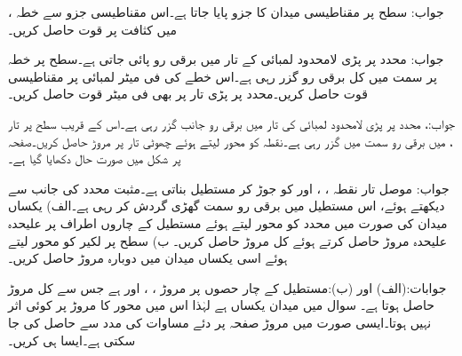 جواب:
سطح  پر مقناطیسی میدان کا  جزو  پایا جاتا ہے۔اس مقناطیسی جزو سے خطہ ،  میں کثافت  پر قوت حاصل کریں۔

جواب:
 محدد پر پڑی لامحدود لمبائی کے تار میں  برقی رو پائی جاتی ہے۔سطح  پر خطہ  پر  سمت میں کل  برقی رو گزر رہی ہے۔اس خطے کی فی میٹر لمبائی پر مقناطیسی قوت حاصل کریں۔محدد  پر پڑی تار پر بھی فی میٹر قوت حاصل کریں۔

جواب:، 
محدد  پر پڑی لامحدود لمبائی کی تار میں  برقی رو  جانب گزر رہی ہے۔اس کے قریب سطح  پر تار ،  میں  برقی رو  سمت میں گزر رہی ہے۔نقطہ  کو محور لیتے ہوئے چھوٹی تار پر مروڑ حاصل کریں۔صفحہ  پر شکل  میں صورت حال دکھایا گیا ہے۔

جواب:
موصل تار نقطہ ، ،  اور  کو جوڑ کر مستطیل بناتی ہے۔مثبت  محدد کی جانب سے دیکھتے ہوئے، اس مستطیل میں  برقی رو سمت گھڑی گردش کر رہی ہے۔الف)  یکساں میدان  کی صورت میں  محدد  کو محور لیتے ہوئے مستطیل کے چاروں اطراف پر علیحدہ علیحدہ  مروڑ حاصل کرتے ہوئے کل مروڑ حاصل کریں۔ ب) سطح  پر لکیر  کو محور لیتے ہوئے اسی یکساں میدان میں دوبارہ مروڑ حاصل کریں۔

جوابات:(الف) اور (ب):مستطیل کے چار حصوں پر مروڑ ، ،  اور  ہے جس سے  کل مروڑ  حاصل ہوتا ہے۔
سوال  میں میدان یکساں ہے لہٰذا اس میں محور کا مروڑ پر کوئی اثر نہیں ہوتا۔ایسی صورت میں مروڑ صفحہ  پر دئے  مساوات  کی مدد سے حاصل کی جا سکتی ہے۔ایسا ہی کریں۔

